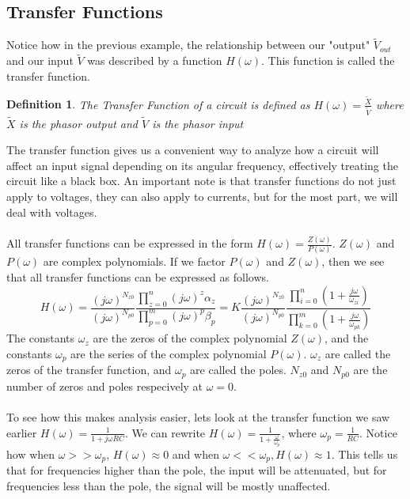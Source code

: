 \documentclass{article}
\newtheorem{definition}{Definition}
\begin{document}
\subsection{Transfer Functions}
Notice how in the previous example, the relationship between our "output" $\tilde{V}_{out}$ and our input $\tilde{V}$ was described by a function $H(\omega)$.
This function is called the transfer function.
\begin{definition}
    The Transfer Function of a circuit is defined as $H(\omega) = \frac{\tilde{X}}{\tilde{V}}$ where $\tilde{X}$ 
    is the phasor output and $\tilde{V}$ is the phasor input
\end{definition}
The transfer function gives us a convenient way to analyze how a circuit will affect an input signal depending on its angular frequency, effectively treating the circuit like a black box.
An important note is that transfer functions do not just apply to voltages, they can also apply to currents, but for the most part, we will deal with voltages.
\\\\All transfer functions can be expressed in the form $H(\omega) = \frac{Z(\omega)}{P(\omega)}$. $Z(\omega)$ and $P(\omega)$ are complex polynomials.
If we factor $P(\omega)$ and $Z(\omega)$, then we see that all transfer functions can be expressed as follows.
$$H(\omega) = \frac{(j\omega)^{N_{z0}}}{(j\omega)^{N_{p0}}} \frac{\prod_{z=0}^{n}{(j\omega)^z \alpha_z}}{\prod_{p=0}^{m}{(j\omega)^p \beta_p}} = K \frac{(j\omega)^{N_{z0}}}{(j\omega)^{N_{p0}}}\frac{\prod_{i=0}^{n}{(1+\frac{j\omega}{\omega_{zi}})}}{\prod_{k=0}^{m}{(1+\frac{j\omega}{\omega_{pk}})}}$$
The constants $\omega_z$ are the zeros of the complex polynomial $Z(\omega)$, and the constants $\omega_p$ are the series of the complex polynomial $P(\omega)$.
$\omega_z$ are called the zeros of the transfer function, and $\omega_p$ are called the poles.
$N_{z0}$ and $N_{p0}$ are the number of zeros and poles respecively at $\omega=0$.
\\\\To see how this makes analysis easier, lets look at the transfer function we saw earlier $H(\omega) = \frac{1}{1 + j\omega RC}$.
We can rewrite $H(\omega) = \frac{1}{1+\frac{\omega}{\omega_p}}$, where $\omega_p = \frac{1}{RC}$.
Notice how when $\omega >> \omega_p$, $H(\omega) \approx 0$ and when $\omega << \omega_p, H(\omega) \approx 1$.
This tells us that for frequencies higher than the pole, the input will be attenuated, but for frequencies less than the pole, the signal will be mostly unaffected.
\end{document}

